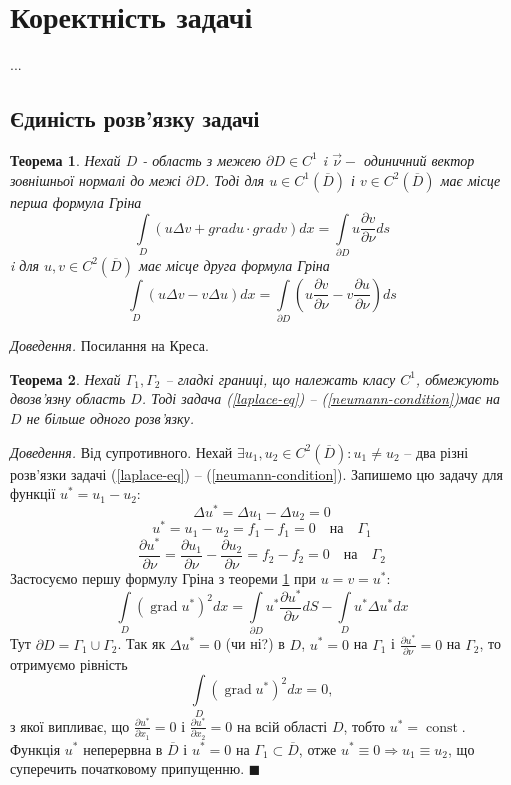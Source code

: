 \documentclass[14pt,a4paper]{extarticle}
\newcounter{e}
\newtheorem{theorem}{Теорема}[section]
\newcommand{\proof}{\textit{Доведення. \space}}
\numberwithin{equation}{section}
\newcommand{\intl}{\int\limits}
\begin{document}
\newcommand{\boundprob}{(\ref{laplace-eq}) -- (\ref{neumann-condition})} 
	
	
 \newpage
 \thispagestyle{empty}
 \section{Коректність задачі}
 ...
 
 \subsection{Єдиність розв'язку задачі}
 \begin{theorem}
	 \label{green}
	 Нехай $D$ - область з межею $\partial D \in C^1$ i $\overrightarrow{\nu} -$ одиничний вектор зовнішньої нормалі до межі $\partial D$. Тоді для $u \in C^1(\overline{D})$ і $v \in C^2(\overline{D})$ має місце перша формула Гріна
	 $$
	 \intl_{D}(u \Delta v+grad u \cdot grad v) d x=\intl_{\partial D} u \frac{\partial v}{\partial \nu} d s
	 $$
	 i для $u, v \in C^{2}(\overline{D})$ має місце друга формула Гріна
	 $$
	 \intl_{D}(u \Delta v-v \Delta u) d x=\intl_{\partial D}\left(u \frac{\partial v}{\partial \nu}-v \frac{\partial u}{\partial \nu}\right) d s
	$$
\end{theorem}

 
 \proof Посилання на Креса.
 
 
\begin{theorem}
	\label{single-sol}
	Нехай $\Gamma_{1}, \Gamma_{2}$ -- гладкі границі, що належать класу $C^1$, обмежують двозв'язну область $D$. Тоді задача \boundprob \space має на $D$ не більше одного розв'язку.
\end{theorem}
 
 \proof Від супротивного. Нехай $\exists u_1, u_2 \in C^{2}(\overline{D}): u_1 \neq u_2 $ -- два різні розв'язки задачі \boundprob. Запишемо цю задачу для функції $u^* = u_1 - u_2$:
 $$
 \Delta u^* = \Delta u_1 - \Delta u_2 = 0
 $$
 $$
 u^* = u_1 - u_2 = f_1 - f_1 = 0 \quad \text{на} \quad \Gamma_1
 $$
 $$
 \frac{\partial u^*}{\partial \nu}
 = \frac{\partial u_1}{\partial \nu} - \frac{\partial u_2}{\partial \nu}
 = f_2 - f_2 = 0 \quad \text{на} \quad \Gamma_2
 $$
 Застосуємо першу формулу Гріна з теореми \ref{green} при $u = v = u^*$:
 $$
 \intl_{D}(\operatorname{grad} u^*)^2 dx
 = \intl_{\partial D} u^* \frac{\partial u^*}{\partial \nu} dS
 - \intl_{D} u^* \Delta u^* dx
 $$
 Тут $\partial D = \Gamma_1 \cup \Gamma_2$. Так як $\Delta u^* = 0 $ (чи ні?) в $D$, $u^*=0$ на $\Gamma_1$ і $\frac{\partial u^*}{\partial \nu} = 0$ на $\Gamma_2$, то отримуємо рівність
 $$
 \intl_{D}(\operatorname{grad} u^*)^2 dx = 0,
 $$
 з якої випливає, що $\frac{\partial u^*}{\partial x_1} = 0$ і $\frac{\partial u^*}{\partial x_2} = 0$ на всій області $D$, тобто $u^* = \operatorname{const}$. Функція $u^*$ неперервна в $\overline{D}$ і $u^*=0$ на $\Gamma_1 \subset \overline{D}$, отже $u^*\equiv0 \Rightarrow u_1\equiv u_2$, що суперечить початковому припущенню. $\blacksquare$
 
\end{document}
